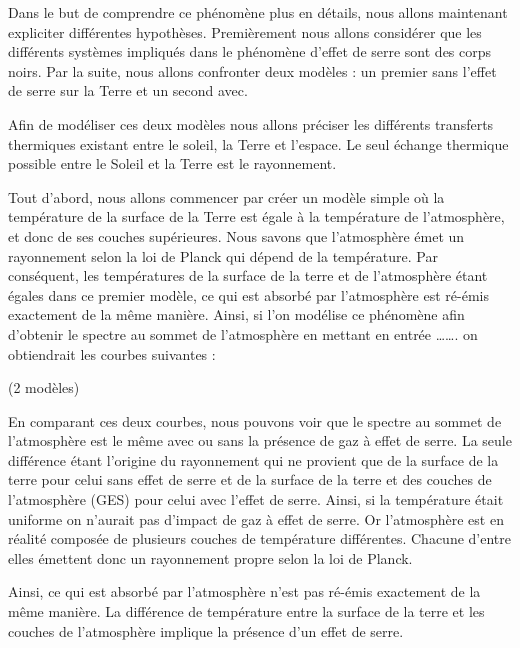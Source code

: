 \documentclass[a4paper, 12pt]{report} %
\begin{document}
Dans le but de comprendre ce phénomène plus en détails, nous allons maintenant expliciter 
différentes hypothèses. Premièrement nous allons considérer que les différents systèmes impliqués 
dans le phénomène d’effet de serre sont des corps noirs. Par la suite, nous allons confronter 
deux modèles : un premier sans l'effet de serre sur la Terre et un second avec.
\vspace{\baselineskip}

Afin de modéliser ces deux modèles nous allons préciser les différents transferts thermiques 
existant entre le soleil, la Terre et l’espace. Le seul échange thermique possible entre le Soleil
 et la Terre est le rayonnement.
\vspace{\baselineskip}

Tout d’abord, nous allons commencer par créer un modèle simple où la température de la surface de 
la Terre est égale à la température de l’atmosphère, et donc de ses couches supérieures. Nous savons 
que l’atmosphère émet un rayonnement selon la loi de Planck qui dépend de la température. Par 
conséquent, les températures de la surface de la terre et de l’atmosphère étant égales dans ce 
premier modèle, ce qui est absorbé par l’atmosphère est ré-émis exactement de la même manière.
Ainsi, si l'on modélise ce phénomène afin d’obtenir le spectre au sommet de l’atmosphère en mettant 
en entrée ……. on obtiendrait les courbes suivantes :
\vspace{\baselineskip}

(2 modèles)
\vspace{\baselineskip}


En comparant ces deux courbes, nous pouvons voir que le spectre au sommet de l’atmosphère est le 
même avec ou sans la présence de gaz à effet de serre. La seule différence étant l’origine du 
rayonnement qui ne provient que de la surface de la terre pour celui sans effet de serre et de la 
surface de la terre et des couches de l'atmosphère (GES) pour celui avec l’effet de serre. 
Ainsi, si la température était uniforme on n’aurait pas d’impact de gaz à effet de serre.
Or l’atmosphère est en réalité composée de plusieurs couches de température différentes. Chacune 
d’entre elles émettent donc un rayonnement propre selon la loi de Planck. 
\vspace{\baselineskip}

Ainsi, ce qui est absorbé par l’atmosphère n’est pas ré-émis exactement de la même manière.
La différence de température entre la surface de la terre et les couches de l’atmosphère implique 
la présence d’un effet de serre.
\vspace{\baselineskip}
\end{document}

